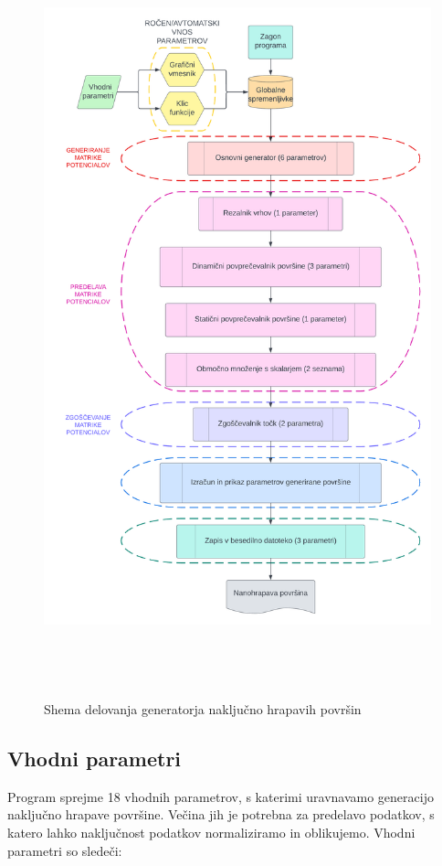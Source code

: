 \documentclass[a4paper,twoside,openright,12pt,slovene]{book}
\begin{document}
\begin{figure}[H]
    \vspace{-4em}
    \centering
    \includegraphics[width=150mm, height=220mm]{Slike/Shema programa.png}
    \caption{Shema delovanja generatorja naključno hrapavih površin}
    \label{fig:shema_delovanja_generatorja}
\end{figure}


\subsection{Vhodni parametri}

Program sprejme 18 vhodnih parametrov, s katerimi uravnavamo generacijo naključno hrapave površine. Večina jih je potrebna za predelavo podatkov, s katero lahko naključnost podatkov normaliziramo in oblikujemo. Vhodni parametri so sledeči:
\end{document}
